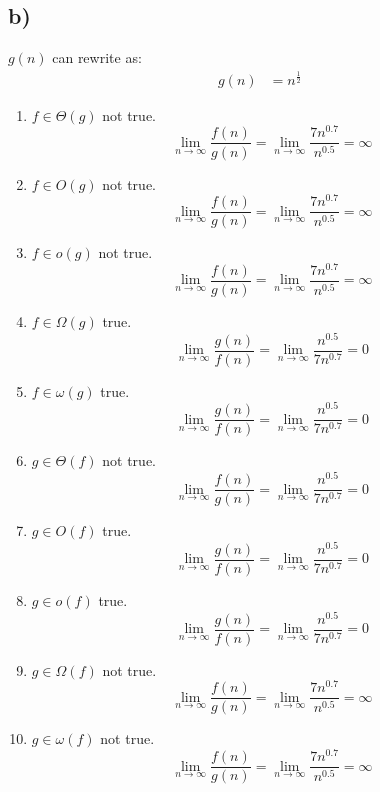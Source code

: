 \documentclass{article}
\begin{document}
\subsection*{b)}
$g(n)$ can rewrite as:
\begin{align*}
    g(n) &= n^{\frac{1}{2}}
\end{align*}
\begin{enumerate}
    \item $f \in \Theta(g)$ not true.
        $$ \lim_{ n \to \infty} \frac{f(n)}{g(n)} = \lim_{ n \to \infty} \frac{ 7 n^{0.7} }{ n^{0.5}} = \infty $$
    \item $f \in O(g)$ not true.
        $$ \lim_{ n \to \infty} \frac{f(n)}{g(n)} = \lim_{ n \to \infty} \frac{ 7 n^{0.7} }{ n^{0.5}} = \infty $$
    \item $f \in o(g)$ not true.
        $$ \lim_{ n \to \infty} \frac{f(n)}{g(n)} = \lim_{ n \to \infty} \frac{ 7 n^{0.7} }{ n^{0.5}} = \infty $$
    \item $f \in \Omega(g)$ true.
        $$ \lim_{ n \to \infty} \frac{g(n)}{f(n)} = \lim_{ n \to \infty} \frac{n^{0.5}}{ 7 n^{0.7}} = 0$$
    \item $f \in \omega(g)$ true.
        $$ \lim_{ n \to \infty} \frac{g(n)}{f(n)} = \lim_{ n \to \infty} \frac{n^{0.5}}{ 7 n^{0.7}} = 0$$
    \item $g \in \Theta(f)$ not true.
        $$ \lim_{ n \to \infty} \frac{f(n)}{g(n)} = \lim_{ n \to \infty} \frac{n^{0.5}}{ 7 n^{0.7}} = 0$$
    \item $g \in O(f)$ true.
        $$ \lim_{ n \to \infty} \frac{g(n)}{f(n)} = \lim_{ n \to \infty} \frac{n^{0.5}}{ 7 n^{0.7}} = 0$$
    \item $g \in o(f)$ true.
        $$ \lim_{ n \to \infty} \frac{g(n)}{f(n)} = \lim_{ n \to \infty} \frac{n^{0.5}}{ 7 n^{0.7}} = 0$$
    \item $g \in \Omega(f)$ not true.
        $$ \lim_{ n \to \infty} \frac{f(n)}{g(n)} = \lim_{ n \to \infty} \frac{7 n^{0.7} }{ n^{0.5}} = \infty $$
    \item $g \in \omega(f)$ not true.
        $$ \lim_{ n \to \infty} \frac{f(n)}{g(n)} = \lim_{ n \to \infty} \frac{7 n^{0.7} }{ n^{0.5}} = \infty $$
\end{enumerate}
\end{document}
